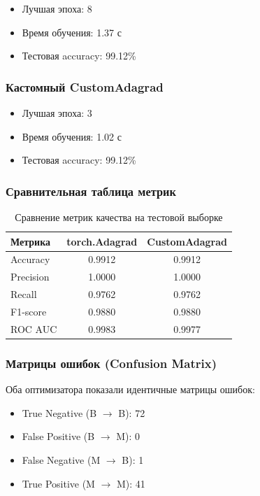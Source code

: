 \begin{itemize}
    \item Лучшая эпоха: 8
    \item Время обучения: 1.37 с
    \item Тестовая accuracy: 99.12\%
\end{itemize}

\subsubsection{Кастомный CustomAdagrad}

\begin{itemize}
    \item Лучшая эпоха: 3
    \item Время обучения: 1.02 с
    \item Тестовая accuracy: 99.12\%
\end{itemize}

\subsubsection{Сравнительная таблица метрик}

\begin{table}[H]
\centering
\begin{tabular}{lcc}
\toprule
\textbf{Метрика} & \textbf{torch.Adagrad} & \textbf{CustomAdagrad} \\
\midrule
Accuracy  & 0.9912 & 0.9912 \\
Precision & 1.0000 & 1.0000 \\
Recall    & 0.9762 & 0.9762 \\
F1-score  & 0.9880 & 0.9880 \\
ROC AUC   & 0.9983 & 0.9977 \\
\bottomrule
\end{tabular}
\caption{Сравнение метрик качества на тестовой выборке}
\end{table}

\subsubsection{Матрицы ошибок (Confusion Matrix)}

Оба оптимизатора показали идентичные матрицы ошибок:

\begin{itemize}
    \item True Negative (B $\to$ B): 72
    \item False Positive (B $\to$ M): 0
    \item False Negative (M $\to$ B): 1
    \item True Positive (M $\to$ M): 41
\end{itemize}

